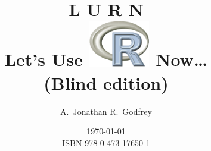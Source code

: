 \documentclass[a4paper,12pt,openany,english]{book}
\newcommand{\Blind}[1]{#1}
\begin{document}
\pagestyle{empty}
\title{L U R N\\[15mm]Let's Use \includegraphics[width=0.2\textwidth]{Other/rlogo}  Now\ldots \Blind{\\ (Blind edition)}}
\author{A.\ Jonathan R.\ Godfrey}
\date{\today \\
ISBN 978-0-473-17650-1}
\maketitle \pagebreak

\frontmatter \pagestyle{plain} 
\clearpage
\tableofcontents


\mainmatter
\pagestyle{headings}




\printindex
\end{document}
